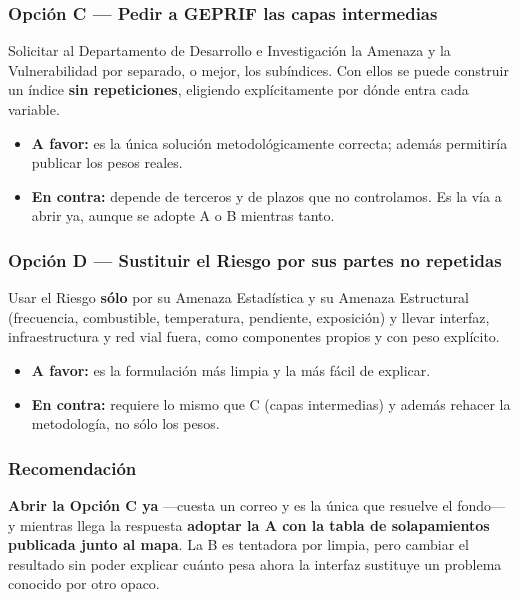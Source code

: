 \documentclass[
  spanish,
  10pt,
]{article}
\providecommand{\tightlist}{%
  \setlength{\itemsep}{0pt}\setlength{\parskip}{0pt}}
\begin{document}
\subsubsection{Opción C --- Pedir a GEPRIF las capas
intermedias}\label{opciuxf3n-c-pedir-a-geprif-las-capas-intermedias}

Solicitar al Departamento de Desarrollo e Investigación la Amenaza y la
Vulnerabilidad por separado, o mejor, los subíndices. Con ellos se puede
construir un índice \textbf{sin repeticiones}, eligiendo explícitamente
por dónde entra cada variable.

\begin{itemize}
\tightlist
\item
  \textbf{A favor:} es la única solución metodológicamente correcta;
  además permitiría publicar los pesos reales.
\item
  \textbf{En contra:} depende de terceros y de plazos que no
  controlamos. Es la vía a abrir ya, aunque se adopte A o B mientras
  tanto.
\end{itemize}

\subsubsection{Opción D --- Sustituir el Riesgo por sus partes no
repetidas}\label{opciuxf3n-d-sustituir-el-riesgo-por-sus-partes-no-repetidas}

Usar el Riesgo \textbf{sólo} por su Amenaza Estadística y su Amenaza
Estructural (frecuencia, combustible, temperatura, pendiente,
exposición) y llevar interfaz, infraestructura y red vial fuera, como
componentes propios y con peso explícito.

\begin{itemize}
\tightlist
\item
  \textbf{A favor:} es la formulación más limpia y la más fácil de
  explicar.
\item
  \textbf{En contra:} requiere lo mismo que C (capas intermedias) y
  además rehacer la metodología, no sólo los pesos.
\end{itemize}

\subsubsection{Recomendación}\label{recomendaciuxf3n}

\textbf{Abrir la Opción C ya} ---cuesta un correo y es la única que
resuelve el fondo--- y mientras llega la respuesta \textbf{adoptar la A
con la tabla de solapamientos publicada junto al mapa}. La B es
tentadora por limpia, pero cambiar el resultado sin poder explicar
cuánto pesa ahora la interfaz sustituye un problema conocido por otro
opaco.
\end{document}
